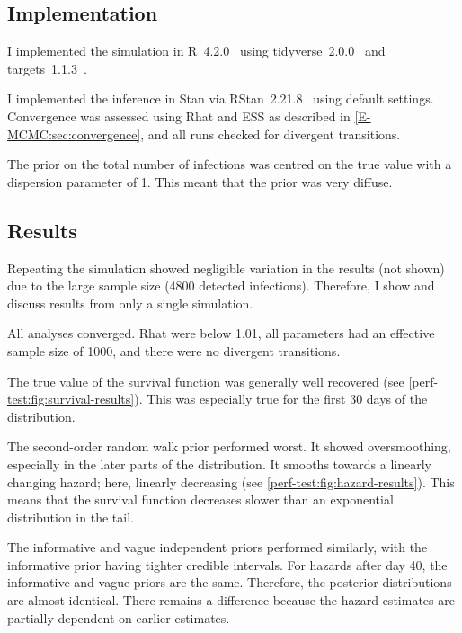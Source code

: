 \documentclass[thesis.tex]{subfiles}
\begin{document}
\subsection{Implementation}

I implemented the simulation in R~4.2.0~\autocite{R-4-2-0} using tidyverse~2.0.0~\autocite{tidyverse} and targets~1.1.3~\autocite{targetsPackage}.

I implemented the inference in Stan via RStan~2.21.8~\autocite{rstan2-21-8} using default settings.
Convergence was assessed using Rhat and ESS as described in \cref{E-MCMC:sec:convergence}, and all runs checked for divergent transitions.

The prior on the total number of infections was centred on the true value with a dispersion parameter of 1.
This meant that the prior was very diffuse.


\subsection{Results} \label{perf-test:sec:results}

Repeating the simulation showed negligible variation in the results (not shown) due to the large sample size (4800 detected infections).
Therefore, I show and discuss results from only a single simulation.

All analyses converged.
Rhat were below 1.01, all parameters had an effective sample size of 1000, and there were no divergent transitions.

The true value of the survival function was generally well recovered (see \cref{perf-test:fig:survival-results}).
This was especially true for the first 30 days of the distribution.

The second-order random walk prior performed worst.
It showed oversmoothing, especially in the later parts of the distribution.
It smooths towards a linearly changing hazard; here, linearly decreasing (see \cref{perf-test:fig:hazard-results}).
This means that the survival function decreases slower than an exponential distribution in the tail.

The informative and vague independent priors performed similarly, with the informative prior having tighter credible intervals.
For hazards after day 40, the informative and vague priors are the same.
Therefore, the posterior distributions are almost identical.
There remains a difference because the hazard estimates are partially dependent on earlier estimates.
\end{document}

